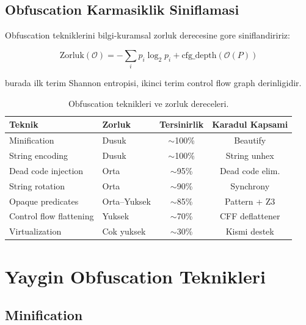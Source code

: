 \subsection{Obfuscation Karmasiklik Siniflamasi}

Obfuscation tekniklerini bilgi-kuramsal zorluk derecesine gore siniflandiririz:

\begin{equation}
\text{Zorluk}(\mathcal{O}) = -\sum_{i} p_i \log_2 p_i + \text{cfg\_depth}(\mathcal{O}(P))
\label{eq:obf-complexity}
\end{equation}

burada ilk terim Shannon entropisi, ikinci terim control flow graph derinligidir.

\begin{table}[h]
\centering
\begin{tabular}{llcc}
\toprule
\textbf{\color{sectioncyan}Teknik} & \textbf{\color{sectioncyan}Zorluk} & \textbf{\color{sectioncyan}Tersinirlik} & \textbf{\color{sectioncyan}Karadul Kapsami} \\
\midrule
Minification & Dusuk & $\sim$100\% & Beautify \\
String encoding & Dusuk & $\sim$100\% & String unhex \\
Dead code injection & Orta & $\sim$95\% & Dead code elim. \\
String rotation & Orta & $\sim$90\% & Synchrony \\
Opaque predicates & Orta--Yuksek & $\sim$85\% & Pattern + Z3 \\
Control flow flattening & Yuksek & $\sim$70\% & CFF deflattener \\
Virtualization & Cok yuksek & $\sim$30\% & Kismi destek \\
\bottomrule
\end{tabular}
\caption{Obfuscation teknikleri ve zorluk dereceleri.}
\label{tab:obf-techniques}
\end{table}


\section{Yaygin Obfuscation Teknikleri}
\label{sec:obf-techniques}

\subsection{Minification}

